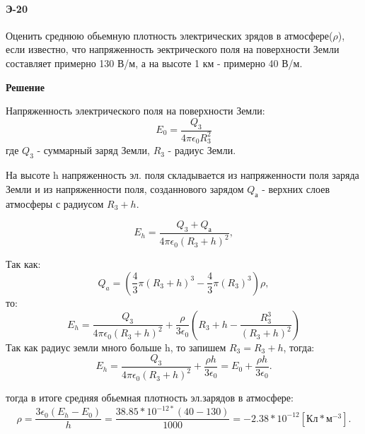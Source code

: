 \documentclass[__main__.tex]{subfiles}
\begin{document}
\paragraph{Э-20}
Оценить среднюю обьемную плотность электрических зрядов в атмосфере($\rho$), если известно, что напряженность эектрического поля на поверхности Земли составляет примерно 130 В/м, а на высоте 1 км - примерно 40 В/м.

\textbf{Решение}

Напряженность электрического поля на поверхности Земли:
\begin{equation}
\label{Э-20\1}
E_{0}=\frac{Q_{3}}{4\pi \epsilon_{0} R^2_{3}}
\end{equation}
 где $Q_{3}$ - суммарный заряд Земли, $R_{3}$ - радиус Земли. 
 
 На высоте h напряженность эл. поля складывается из напряженности поля заряда Земли и из напряженности поля, созданнового зарядом $Q_{а}$ - верхних слоев атмосферы с радиусом  $R_{3}+h$.
 
 \begin{equation}
 \label{Э-20\2}
 E_{h}=\frac{Q_{3}+Q_{а}}{4\pi \epsilon_{0} (R_{3}+h)^{2}},
 \end{equation}
 
 Так как:
  \begin{equation}
 \label{Э-20\3}
 Q_{a}=(\frac{4}{3}\pi (R_{3}+h)^{3}-\frac{4}{3}\pi (R_{3})^{3})\rho,
 \end{equation}
 то:
  \begin{equation}
 \label{Э-20\4}
 E_{h}=\frac{Q_{3}}{4\pi \epsilon_{0} (R_{3}+h)^{2}}+\frac{\rho}{3\epsilon_{0}}(R_{3}+h-\frac{R_{3}^{3}}{(R_{3}+h)^{2}})
 \end{equation}
 Так как радиус земли много больше h, то запишем $R_{3}=R_{3}+h$, тогда:
  \begin{equation}
 \label{Э-20\5}
 E_{h}=\frac{Q_{3}}{4\pi \epsilon_{0} (R_{3}+h)^{2}}+\frac{\rho h}{3\epsilon_{0}}=E_{0}+\frac{\rho h}{3\epsilon_{0}}.
 \end{equation}
 
 тогда в итоге средняя обьемная плотность эл.зарядов в атмосфере:
  \begin{equation}
 \label{Э-20\6}
\rho=\frac{3\epsilon_{0}(E_{h}-E_{0})}{h}=\frac{3 8.85*10^{-12*}(40-130)}{1000}=-2.38*10^{-12} [Кл * м^{-3}].
 \end{equation}
 
\end{document}
